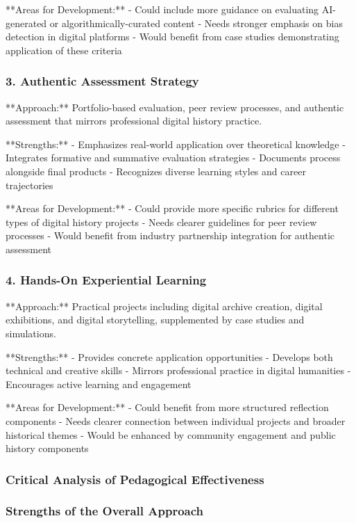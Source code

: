 **Areas for Development:**
- Could include more guidance on evaluating AI-generated or algorithmically-curated content
- Needs stronger emphasis on bias detection in digital platforms
- Would benefit from case studies demonstrating application of these criteria

\subsubsection {3. Authentic Assessment Strategy}

**Approach:** Portfolio-based evaluation, peer review processes, and authentic assessment that mirrors professional digital history practice.

**Strengths:**
- Emphasizes real-world application over theoretical knowledge
- Integrates formative and summative evaluation strategies
- Documents process alongside final products
- Recognizes diverse learning styles and career trajectories

**Areas for Development:**
- Could provide more specific rubrics for different types of digital history projects
- Needs clearer guidelines for peer review processes
- Would benefit from industry partnership integration for authentic assessment

\subsubsection {4. Hands-On Experiential Learning}

**Approach:** Practical projects including digital archive creation, digital exhibitions, and digital storytelling, supplemented by case studies and simulations.

**Strengths:**
- Provides concrete application opportunities
- Develops both technical and creative skills
- Mirrors professional practice in digital humanities
- Encourages active learning and engagement

**Areas for Development:**
- Could benefit from more structured reflection components
- Needs clearer connection between individual projects and broader historical themes
- Would be enhanced by community engagement and public history components

\subsubsection {Critical Analysis of Pedagogical Effectiveness}

\subsubsection {Strengths of the Overall Approach}

